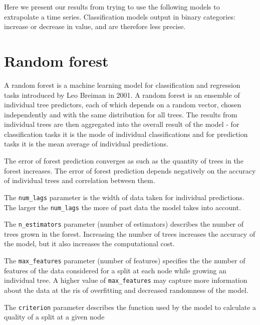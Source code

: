 Here we present our results from trying to use the following models to extrapolate a time series.
Classification models output in binary categories: increase or decrease in value, and are therefore less precise.













\section{Random forest}
A random forest is a machine learning model for classification and regression tasks introduced by Leo Breiman in 2001. A random forest is an ensemble of individual tree predictors, each of which depends on a random vector, chosen independently and with the same distribution for all trees. The results from individual trees are then aggregated into the overall result of the model - for classification tasks it is the mode of individual classifications and for prediction tasks it is the mean average of individual predictions.

The error of forest prediction converges as such as the quantity of trees in the forest increases. The error of forest prediction depends negatively on the accuracy of individual trees and correlation between them.

The \verb|num_lags| parameter is the width of data taken for individual predictions. The larger the \verb|num_lags| the more of past data the model takes into account.

The \verb|n_estimators| parameter (number of estimators) describes the number of trees grown in the forest. Increasing the number of trees increases the accuracy of the model, but it also increases the computational cost.

The \verb|max_features| parameter (number of features) specifies the the number of features of the data considered for a split at each node while growing an individual tree. A higher value of \verb|max_features| may capture more information about the data at the ris of overfitting and decreased randomness of the model.

The \verb|criterion| parameter describes the function used by the model to calculate a quality of a split at a given node



